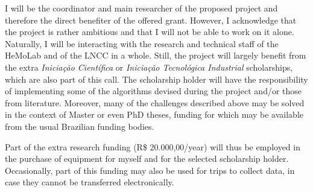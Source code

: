 I will be the coordinator and main researcher of the proposed project and therefore the direct benefiter of the offered grant. However, I acknowledge that the project is rather ambitious and that I will not be able to work on it alone. Naturally, I will be interacting with the research and technical staff of the HeMoLab and of the LNCC in a whole. Still, the project will largely benefit from the extra {\em Inicia\c{c}\~ao Cient\'ifica} or {\em Inicia\c{c}\~ao Tecnol\'ogica Industrial} scholarships, which are also part of this call. The scholarship holder will have the responsibility of implementing some of the algorithms devised during the project and/or those from literature. Moreover, many of the challenges described above may be solved in the context of Master or even PhD theses, funding for which may be available from the usual Brazilian funding bodies.

Part of the extra research funding (R\$ 20.000,00/year) will thus be employed in the purchase of equipment for myself and for the selected scholarship holder. Occasionally, part of this funding may also be used for trips to collect data, in case they cannot be transferred electronically.
